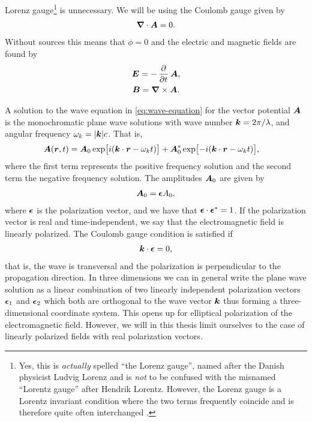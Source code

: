         Lorenz gauge\footnote{%
            Yes, this is \emph{actually} spelled ``the Lorenz gauge'', named
            after the Danish physicist Ludvig Lorenz and is \emph{not} to be
            confused with the misnamed ``Lorentz gauge'' after Hendrik Lorentz.
            However, the Lorenz gauge is a Lorentz invariant condition where the
            two terms frequently coincide and is therefore quite often
            interchanged \cite{wiki:lorenz}.
        } is unnecessary.
        We will be using the Coulomb gauge given by
        \begin{align}
            \boldsymbol{\nabla}\cdot\boldsymbol{A} = 0.
        \end{align}
        Without sources this means that $\phi = 0$ and the electric and magnetic
        fields are found by
        \begin{gather}
            \vfg{E} = -\dpd{}{t}\vfg{A}, \\
            \vfg{B} = \vfg{\nabla}\times \vfg{A}.
        \end{gather}

        A solution to the wave equation in \autoref{eq:wave-equation} for the
        vector potential $\boldsymbol{A}$ is the monochromatic plane wave solutions
        with wave number $\boldsymbol{k} = 2\pi / \lambda$, and angular frequency
        $\omega_k = \abs{\boldsymbol{k}} c$.
        That is,
        \begin{align}
            \boldsymbol{A}(\boldsymbol{r}, t)
            &= \boldsymbol{A}_0 \exp[i(\boldsymbol{k}\cdot \boldsymbol{r} - \omega_k t)]
            + \boldsymbol{A}^{*}_0 \exp[-i(\boldsymbol{k}\cdot\boldsymbol{r} - \omega_k t)],
            \label{eq:plane-wave}
        \end{align}
        where the first term represents the positive frequency solution and the
        second term the negative frequency solution.
        The amplitudes $\boldsymbol{A}_0$ are given by
        \begin{align}
            \boldsymbol{A}_0 = \boldsymbol{\epsilon} A_0,
        \end{align}
        where $\boldsymbol{\epsilon}$ is the polarization vector, and we have that
        $\boldsymbol{\epsilon}\cdot\boldsymbol{\epsilon}^{*} = 1$.
        If the polarization vector is real and time-independent, we say that the
        electromagnetic field is linearly polarized.
        The Coulomb gauge condition is satisfied if
        \begin{align}
            \boldsymbol{k}\cdot \boldsymbol{\epsilon} = 0,
        \end{align}
        that is, the wave is transversal and the polarization is perpendicular
        to the propagation direction.
        In three dimensions we can in general write the plane wave solution as a
        linear combination of two linearly independent polarization vectors
        $\boldsymbol{\epsilon}_1$ and $\boldsymbol{\epsilon}_2$ which both are orthogonal to
        the wave vector $\boldsymbol{k}$ thus forming a three-dimensional coordinate
        system.
        This opens up for elliptical polarization of the electromagnetic field.
        However, we will in this thesis limit ourselves to the case of linearly
        polarized fields with real polarization vectors.

